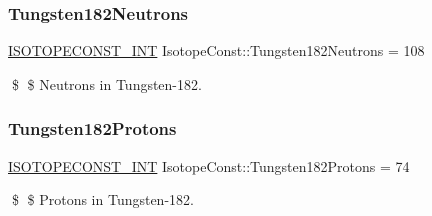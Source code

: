\subsubsection{\texorpdfstring{Tungsten182\+Neutrons}{Tungsten182Neutrons}}
{\footnotesize\ttfamily \mbox{\hyperlink{group___isotope_const-_macros_ga5f18360b3e99483a35c32d789e62621c}{I\+S\+O\+T\+O\+P\+E\+C\+O\+N\+S\+T\+\_\+\+I\+NT}} Isotope\+Const\+::\+Tungsten182\+Neutrons = 108}

\$ \$ Neutrons in Tungsten-\/182. \mbox{\label{group___isotope_const-_tungsten-_w182_ga3088cbfcd3af9ebda23164fc5b37f877}} 
\subsubsection{\texorpdfstring{Tungsten182\+Protons}{Tungsten182Protons}}
{\footnotesize\ttfamily \mbox{\hyperlink{group___isotope_const-_macros_ga5f18360b3e99483a35c32d789e62621c}{I\+S\+O\+T\+O\+P\+E\+C\+O\+N\+S\+T\+\_\+\+I\+NT}} Isotope\+Const\+::\+Tungsten182\+Protons = 74}

\$ \$ Protons in Tungsten-\/182. 